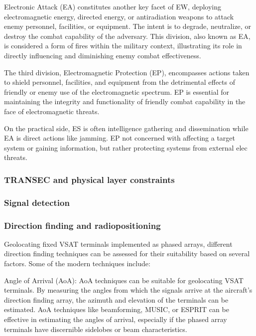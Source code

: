 \documentclass[english, 12pt, a4paper, elec, utf8, a-1b, online]{aaltothesis}
\begin{document}
Electronic Attack (EA) constitutes another key facet of EW, deploying electromagnetic energy, directed energy, or antiradiation weapons to attack enemy personnel, facilities, or equipment. The intent is to degrade, neutralize, or destroy the combat capability of the adversary. This division, also known as EA, is considered a form of fires within the military context, illustrating its role in directly influencing and diminishing enemy combat effectiveness.

The third division, Electromagnetic Protection (EP), encompasses actions taken to shield personnel, facilities, and equipment from the detrimental effects of friendly or enemy use of the electromagnetic spectrum. EP is essential for maintaining the integrity and functionality of friendly combat capability in the face of electromagnetic threats.

On the practical side, ES is often intelligence gathering and dissemination while EA is direct actions like jamming. EP not concerned with affecting a target system or gaining information, but rather protecting systems from external elec threats.

\subsubsection{TRANSEC and physical layer constraints}

\subsubsection{Signal detection}

\subsubsection{Direction finding and radiopositioning}
Geolocating fixed VSAT terminals implemented as phased arrays, different direction finding techniques can be assessed for their suitability based on several factors.
Some of the modern techniques include:

Angle of Arrival (AoA): AoA techniques can be suitable for geolocating VSAT terminals.
By measuring the angles from which the signals arrive at the aircraft's direction finding array, the azimuth and elevation of the terminals can be estimated.
AoA techniques like beamforming, MUSIC, or ESPRIT can be effective in estimating the angles of arrival, especially if the phased array terminals have discernible sidelobes or beam characteristics.
\end{document}
